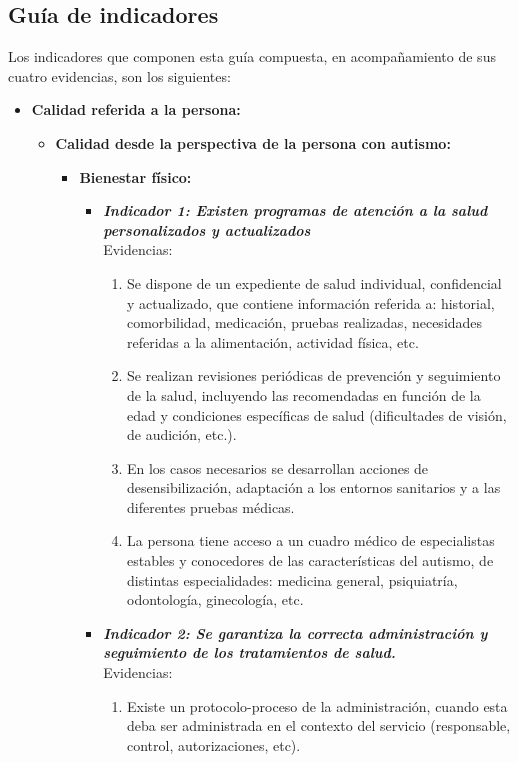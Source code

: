 \subsection{Guía de indicadores}
Los indicadores que componen esta guía compuesta, en acompañamiento de sus cuatro evidencias, son los siguientes:
\begin{itemize}
	\item \textbf{Calidad referida a la persona:}
	\begin{itemize}
		\item \textbf{Calidad desde la perspectiva de la persona con autismo:}
		\begin{itemize}
			\item \textbf{Bienestar físico:}
			\begin{itemize}
				\item \textbf{\textit{Indicador 1: Existen programas de atención a la salud personalizados y actualizados}}\\Evidencias:
				\begin{enumerate}
					\item Se dispone de un expediente de salud individual, confidencial y actualizado, que contiene información referida a: historial, comorbilidad, medicación, pruebas realizadas, necesidades referidas a la alimentación, actividad física, etc.      
					\item Se realizan revisiones periódicas de prevención y seguimiento de la salud, incluyendo las recomendadas en función de la edad y condiciones específicas de salud (dificultades de visión, de audición, etc.).             
					\item En los casos necesarios se desarrollan acciones de desensibilización, adaptación a los entornos sanitarios y a las diferentes pruebas médicas.      
					\item La persona tiene acceso a un cuadro médico de especialistas estables y conocedores de las características del autismo, de distintas especialidades: medicina general, psiquiatría, odontología, ginecología, etc.
				\end{enumerate}
				\item \textbf{\textit{Indicador 2: Se garantiza la correcta administración y seguimiento de los tratamientos de salud.}}\\Evidencias:
				\begin{enumerate}
					\item Existe un protocolo-proceso de la administración, cuando esta deba ser administrada en el contexto del servicio (responsable, control, autorizaciones, etc). 

\end{enumerate}
\end{itemize}
\end{itemize}
\end{itemize}
\end{itemize}

